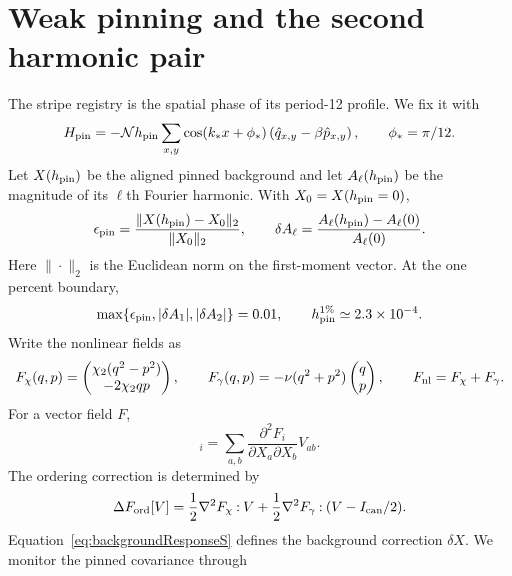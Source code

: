 \documentclass[aps,prl,twocolumn,superscriptaddress,nofootinbib,floatfix]{revtex4-2}
\newcommand{\cN}{\mathcal N}
\begin{document}
\section{Weak pinning and the second harmonic pair}
The stripe registry is the spatial phase of its period-12 profile. We fix it with
\begin{equation}
 H_{\rm pin}=-\cN h_{\rm pin}\sum_{x,y}\cos(k_*x+\phi_*)
 \left(\hat q_{x,y}-\beta\hat p_{x,y}\right),
 \qquad \phi_*=\pi/12.
 \label{eq:pinS}
\end{equation}
Let $X(h_{\rm pin})$ be the aligned pinned background and let $A_\ell(h_{\rm pin})$ be the magnitude of its $\ell$th Fourier harmonic. With $X_0=X(h_{\rm pin}=0)$,
\begin{equation}
 \epsilon_{\rm pin}=\frac{\|X(h_{\rm pin})-X_0\|_2}{\|X_0\|_2},
 \qquad
 \delta A_\ell=\frac{A_\ell(h_{\rm pin})-A_\ell(0)}{A_\ell(0)}.
 \label{eq:pinDeformationS}
\end{equation}
Here $\|\cdot\|_2$ is the Euclidean norm on the first-moment vector. At the one percent boundary,
\begin{equation}
 \max\{\epsilon_{\rm pin},|\delta A_1|,|\delta A_2|\}=0.01,
 \qquad h_{\rm pin}^{1\%}\simeq2.3\times10^{-4}.
 \label{eq:pinCriterionS}
\end{equation}
Write the nonlinear fields as
\begin{equation}
 F_\chi(q,p)=\begin{pmatrix}\chi_2(q^2-p^2)\\-2\chi_2qp\end{pmatrix},
 \qquad
 F_\gamma(q,p)=-\nu(q^2+p^2)\begin{pmatrix}q\\p\end{pmatrix},
 \qquad F_{\rm nl}=F_\chi+F_\gamma.
 \label{eq:nonlinearFieldsS}
\end{equation}
For a vector field $F$,
\begin{equation}
 [\nabla^2F\mathbin{:}V]_i=\sum_{a,b}\frac{\partial^2F_i}{\partial X_a\partial X_b}V_{ab}.
 \label{eq:hessianContractionS}
\end{equation}
The ordering correction is determined by
\begin{equation}
 \Delta F_{\rm ord}[V]
 =\frac12\nabla^2F_\chi\mathbin{:}V
 +\frac12\nabla^2F_\gamma\mathbin{:}(V-I_{\rm can}/2).
 \label{eq:orderingCorrectionS}
\end{equation}
Equation~\eqref{eq:backgroundResponseS} defines the background correction $\delta X$. We monitor the pinned covariance through
\end{document}
